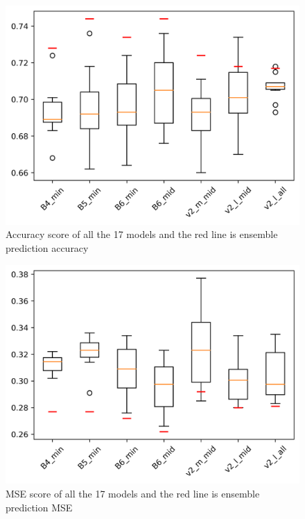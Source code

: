 \documentclass[10pt,letterpaper]{article}
\begin{document}
\begin{figure}[h!]
  \centering
  \begin{minipage}[b]{1.0\textwidth}
  \includegraphics[scale=0.2]{results/box_plot_models_acc.png}
    \caption{Accuracy score of all the 17 models and the red line is ensemble prediction accuracy}
   \label{marker4}
  \end{minipage}
  \hfill
\end{figure}

\begin{figure}[h!]
  \centering
  \begin{minipage}[b]{0.49\textwidth}
  \includegraphics[scale=0.2]{results/box_plot_models_mse.png}
    \caption{MSE score of all the 17 models and the red line is ensemble prediction MSE}
   \label{marker5}
  \end{minipage}
  \hfill
\end{figure}
\end{document}
